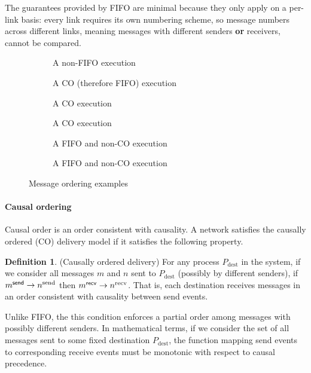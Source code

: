 \documentclass[]             %
{NASA}                       %
\theoremstyle{definition}
\newtheorem{definition}{Definition}[section]
\begin{document}
The guarantees provided by FIFO are minimal because they only apply on
a per-link basis: every link requires its own numbering scheme, so
message numbers across different links, meaning messages with
different senders \textbf{or} receivers, cannot be compared.

\begin{figure}[p]
  \setlength\abovecaptionskip{0ex}
  \setlength\belowcaptionskip{4ex}
  \begin{subfigure}[t]{0.475\textwidth}
    \centering
    
    \caption{A non-FIFO execution}
    \label{fig:ordex-non-fifo}
  \end{subfigure}
  \begin{subfigure}[t]{0.475\textwidth}
  \centering
  
  \caption{A CO (therefore FIFO) execution}
  \label{fig:ordex-co-1}
\end{subfigure}
\begin{subfigure}[b]{0.475\textwidth}
  \centering
  
  \caption{A CO execution}
  \label{fig:ordex-co-2}
\end{subfigure}
\begin{subfigure}[b]{0.475\textwidth}
  \centering
  
  \caption{A CO execution}
  \label{fig:ordex-co-3}
\end{subfigure}
\begin{subfigure}[b]{0.475\textwidth}
  \centering
  
  \caption{A FIFO and non-CO execution}
  \label{fig:ordex-non-co-1}
\end{subfigure}\hfill
\begin{subfigure}[b]{0.475\textwidth}
  \centering
  
  \caption{A FIFO and non-CO execution}
  \label{fig:ordex-non-co-2}
\end{subfigure}
\caption{Message ordering examples}
\label{fig:message-ordering}
\end{figure}

\paragraph{Causal ordering}
Causal order is an order consistent with causality. A network
satisfies the causally ordered (CO) delivery model if it satisfies the
following property.
\begin{definition}(Causally ordered delivery)
  \label{def:causalorder}
  For any process $P_\mathrm{dest}$ in the system, if we consider all
  messages $m$ and $n$ sent to $P_\mathrm{dest}$ (possibly by
  different senders), if $m_{}^{\mathsf{send}} \to n^\textrm{send}$ then
  $m_{}^{\mathsf{recv}} \to n^\textrm{recv}$. That is, each destination
  receives messages in an order consistent with causality between send
  events.
\end{definition}
Unlike FIFO, the this condition enforces a partial order among
messages with possibly different senders. In mathematical terms, if
we consider the set of all messages sent to some fixed destination
$P_{\mathrm{dest}}$, the function mapping send events to corresponding
receive events must be monotonic with respect to causal precedence.
\end{document}
